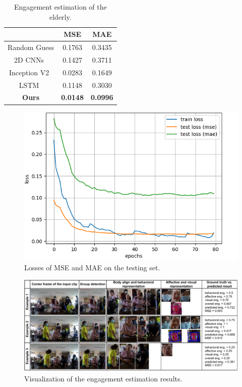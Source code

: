 \documentclass[VANCOUVER,STIX1COL]{WileyNJD-v2}
\begin{document}
\begin{table}[hbt]
  \vskip -0.3cm
  \centering
  \caption{Engagement estimation of the elderly.}
  \label{t:main_results}
  \begin{tabular}{ccc}
  \toprule
  \textbf{} & \textbf{MSE} & \textbf{MAE} \\
  \midrule
  Random Guess & 0.1763 & 0.3435 \\
  2D CNNs~\cite{Anagnostopoulou2021Engagement} & 0.1427 & 0.3711 \\
  Inception V2~\cite{Saleh2021Improving} & 0.0283 & 0.1649 \\
  LSTM~\cite{Steinert2020Engagement} & 0.1148 & 0.3030 \\
  \midrule
  \textbf{Ours}& \textbf{0.0148} & \textbf{0.0996} \\
  \bottomrule
  \end{tabular}
\end{table}
\vskip -0.8cm

\begin{figure}[hbt]
  \centering
  \includegraphics[width=0.55\linewidth]{assets/loss}
  \caption{Losses of MSE and MAE on the testing set.}
  \label{f:loss}
\end{figure}
\vskip -0.8cm

\begin{figure}[hbt!]
  \centering
  \includegraphics[width=0.85\linewidth]{assets/visualization}
  \caption{Visualization of the engagement estimation results.}
  \label{f:visualization}
\end{figure}
\end{document}
